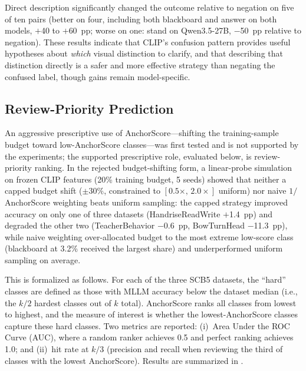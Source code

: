 \documentclass[a4paper,fleqn]{cas-sc}
\begin{document}
Direct description significantly changed the outcome relative to negation on five of ten pairs (better on four, including both blackboard and answer on both models, $+$40 to $+$60~pp; worse on one: stand on Qwen3.5-27B, $-$50~pp relative to negation). These results indicate that CLIP's confusion pattern provides useful hypotheses about \emph{which} visual distinction to clarify, and that describing that distinction directly is a safer and more effective strategy than negating the confused label, though gains remain model-specific.

\subsection{Review-Priority Prediction}
\label{sec:ranking}

An aggressive prescriptive use of AnchorScore---shifting the training-sample budget toward low-AnchorScore classes---was first tested and is not supported by the experiments; the supported prescriptive role, evaluated below, is review-priority ranking. In the rejected budget-shifting form, a linear-probe simulation on frozen CLIP features (20\% training budget, 5 seeds) showed that neither a capped budget shift ($\pm 30\%$, constrained to $[0.5\times,\,2.0\times]$ uniform) nor naive $1/$AnchorScore weighting beats uniform sampling: the capped strategy improved accuracy on only one of three datasets (HandriseReadWrite $+$1.4~pp) and degraded the other two (TeacherBehavior $-$0.6~pp, BowTurnHead $-$11.3~pp), while naive weighting over-allocated budget to the most extreme low-score class (blackboard at 3.2\% received the largest share) and underperformed uniform sampling on average.

This is formalized as follows. For each of the three SCB5 datasets, the ``hard'' classes are defined as those with MLLM accuracy below the dataset median (i.e., the $k/2$ hardest classes out of $k$ total). AnchorScore ranks all classes from lowest to highest, and the measure of interest is whether the lowest-AnchorScore classes capture these hard classes. Two metrics are reported: (i)~Area Under the ROC Curve (AUC), where a random ranker achieves 0.5 and perfect ranking achieves 1.0; and (ii)~hit rate at $k/3$ (precision and recall when reviewing the third of classes with the lowest AnchorScore). Results are summarized in .
\end{document}
